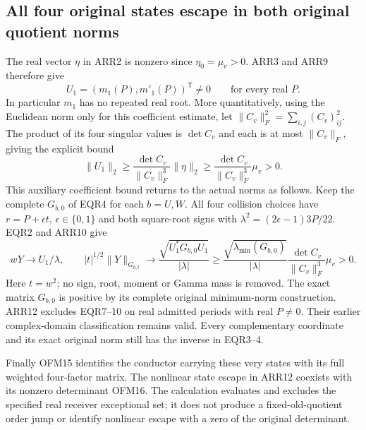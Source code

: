 \documentclass[11pt]{article}
\begin{document}
\subsection{All four original states escape in both original quotient norms}
The real vector $\eta$ in ARR2 is nonzero since $\eta_0=\mu_v>0$.
ARR3 and ARR9 therefore give
\[
 U_1=(m_1(P),m'_1(P))^{\mathsf T}\ne0
 \qquad\text{for every real }P.
 \tag{ARR10}
\]
In particular $m_1$ has no repeated real root. More quantitatively,
using the Euclidean norm only for this coefficient estimate, let
$\|C_v\|_F^2=\sum_{i,j}(C_v)_{ij}^2$.
The product of its four singular values is $\det C_v$ and each is
at most $\|C_v\|_F$, giving the explicit bound
\[
 \|U_1\|_2\ge
 \frac{\det C_v}{\|C_v\|_F^3}\|\eta\|_2
 \ge\frac{\det C_v}{\|C_v\|_F^3}\mu_v>0.
 \tag{ARR11}
\]
This auxiliary coefficient bound returns to the actual norms as
follows. Keep the complete $G_{b,0}$ of EQR4 for each $b=U,W$.
All four collision choices have $r=P+\epsilon t$,
$\epsilon\in\{0,1\}$ and both square-root signs with
$\lambda^2=(2\epsilon-1)3P/22$. EQR2 and ARR10 give
\[
 wY\longrightarrow U_1/\lambda,\qquad
 |t|^{1/2}\|Y\|_{G_{b,t}}\longrightarrow
 \frac{\sqrt{U_1^*G_{b,0}U_1}}{|\lambda|}
 \ge\frac{\sqrt{\lambda_{\min}(G_{b,0})}}{|\lambda|}
       \frac{\det C_v}{\|C_v\|_F^3}\mu_v>0.
 \tag{ARR12}
\]
Here $t=w^2$; no sign, root, moment or Gamma mass is removed.
The exact matrix $G_{b,0}$ is positive by its complete original
minimum-norm construction. ARR12 excludes EQR7--10 on real
admitted periods with real $P\ne0$. Their earlier complex-domain
classification remains valid. Every complementary coordinate and
its exact original norm still has the inverse in EQR3--4.

Finally OFM15 identifies the conductor carrying these very states
with its full weighted four-factor matrix. The nonlinear state
escape in ARR12 coexists with its nonzero determinant OFM16.
The calculation evaluates and excludes the specified real receiver
exceptional set; it does not produce a fixed-old-quotient order jump
or identify nonlinear escape with a zero of the original determinant.
\end{document}
